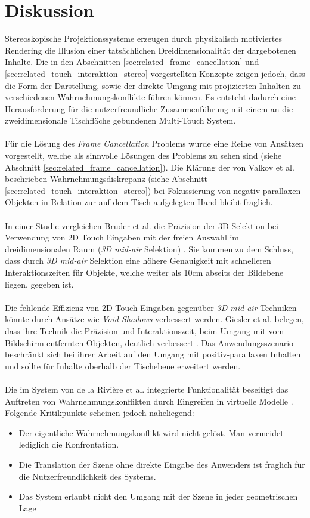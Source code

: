 \section{Diskussion}
\label{sec:diskussion_wahrnehmungskonflikte}

Stereoskopische Projektionssysteme erzeugen durch physikalisch motiviertes Rendering die Illusion einer tatsächlichen Dreidimensionalität der dargebotenen Inhalte. Die in den Abschnitten \ref{sec:related_frame_cancellation} und \ref{sec:related_touch_interaktion_stereo} vorgestellten Konzepte zeigen jedoch, dass die Form der Darstellung, sowie der direkte Umgang mit projizierten Inhalten zu verschiedenen Wahrnehmungskonflikte führen können. Es entsteht dadurch eine Herausforderung für die nutzerfreundliche Zusammenführung mit einem an die zweidimensionale Tischfläche gebundenen Multi-Touch System. 
\\\\
Für die Lösung des \emph{Frame Cancellation} Problems wurde eine Reihe von Ansätzen vorgestellt, welche als sinnvolle Lösungen des Problems zu sehen sind (siehe Abschnitt \ref{sec:related_frame_cancellation}). Die Klärung der von Valkov et al. beschrieben Wahrnehmungsdiskrepanz (siehe Abschnitt \ref{sec:related_touch_interaktion_stereo}) bei Fokussierung von negativ-parallaxen Objekten in Relation zur auf dem Tisch aufgelegten Hand bleibt fraglich.
\\\\
In einer Studie vergleichen Bruder et al. die Präzision der 3D Selektion bei Verwendung von 2D Touch Eingaben mit der freien Auswahl im dreidimensionalen Raum (\emph{3D mid-air} Selektion) \cite{bruder:2013}. Sie kommen zu dem Schluss, dass durch \emph{3D mid-air} Selektion eine höhere Genauigkeit mit schnelleren Interaktionszeiten für Objekte, welche weiter als 10cm abseits der Bildebene liegen, gegeben ist.
\\\\
Die fehlende Effizienz von 2D Touch Eingaben gegenüber \emph{3D mid-air} Techniken könnte durch Ansätze wie \emph{Void Shadows} verbessert werden. Giesler et al. belegen, dass ihre Technik die Präzision und Interaktionszeit, beim Umgang mit vom Bildschirm entfernten Objekten, deutlich verbessert \cite{giesler:2014}. Das Anwendungsszenario beschränkt sich bei ihrer Arbeit auf den Umgang mit positiv-parallaxen Inhalten und sollte für Inhalte oberhalb der Tischebene erweitert werden.
\\\\
Die im System von de la Rivière et al. integrierte Funktionalität beseitigt das Auftreten von Wahrnehmungskonflikten durch Eingreifen in virtuelle Modelle \cite{delariviere:2010}. Folgende Kritikpunkte scheinen jedoch naheliegend:

\begin{itemize}
	\item Der eigentliche Wahrnehmungskonflikt wird nicht gelöst. Man vermeidet lediglich die Konfrontation.
	\item Die Translation der Szene ohne direkte Eingabe des Anwenders ist fraglich für die Nutzerfreundlichkeit des Systems.
	\item Das System erlaubt nicht den Umgang mit der Szene in jeder geometrischen Lage
\end{itemize}